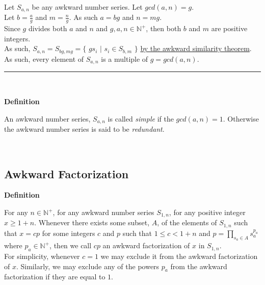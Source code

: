 \documentclass[a4paper,12pt]{article}
\begin{document}
\noindent Let $S_{a,n}$ be any awkward number series.  Let $gcd(a,n) = g$.\\

\noindent Let $b = \frac{a}{g}$ and $m = \frac{n}{g}$. As such $a = bg$ and $n = mg$.\\

\noindent Since $g$ divides both $a$ and $n$ and $g, a, n \in \mathbb{N}^+$, then both $b$ and $m$ are positive integers.\\

\noindent As such, $S_{a, n} = S_{bg, mg} = \{$ $gs_i$ $|$ $s_i \in S_{b,m}$ $\}$ \hyperlink{theorem:similar_theorem}{by the awkward similarity theorem}.\\

\noindent As such, every element of $S_{a,n}$ is a multiple of $g = gcd(a, n)$.

\begin{center}
\noindent\rule{8cm}{0.4pt}
\end{center}
\noindent \\







\label{definition:simple_and_redundant_series}
\hypertarget{definition:simple_and_redundant_series}{}
\begin{tcolorbox}
\textbf{Definition}

An awkward number series, $S_{a,n}$ is called \textit{simple} if the $gcd(a,n) = 1$. Otherwise the awkward number series is said to be \textit{redundant}.

\end{tcolorbox}
\noindent \\




\subsection{Awkward Factorization}
\label{subsection:awkward_factorization}

\label{definition:awkward_factorization}
\hypertarget{definition:awkward_factorization}{}
\begin{tcolorbox}
\textbf{Definition}

For any $n \in \mathbb{N}^+$, for any awkward number series $S_{1,n}$, for any positive integer $x \geq 1 + n$. Whenever there exists some subset, $A$, of the elements of $S_{1,n}$ such that $x = cp$ for some integers $c$ and $p$ such that $1 \leq c < 1 + n$ and $p = \displaystyle \prod_{s_a \in A} s_a^{p_a}$ where $p_a \in \mathbb{N}^+$, then we call $cp$ an awkward factorization of $x$ in $S_{1, n}$.\\

\noindent For simplicity, whenever $c = 1$ we may exclude it from the awkward factorization of $x$. Similarly, we may exclude any of the powers $p_a$ from the awkward factorization if they are equal to $1$.

\end{tcolorbox}
\noindent \\
\end{document}
